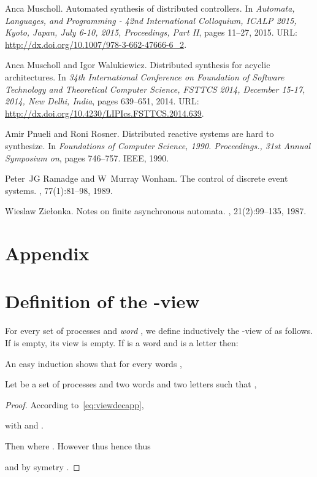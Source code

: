 \documentclass[a4paper,UKenglish]{lipics-v2016}
\begin{document}
\begin{thebibliography}{10}
Anca Muscholl.
\newblock Automated synthesis of distributed controllers.
\newblock In {\em Automata, Languages, and Programming - 42nd International
  Colloquium, {ICALP} 2015, Kyoto, Japan, July 6-10, 2015, Proceedings, Part
  {II}}, pages 11--27, 2015.
\newblock URL: \url{http://dx.doi.org/10.1007/978-3-662-47666-6_2}.

Anca Muscholl and Igor Walukiewicz.
\newblock Distributed synthesis for acyclic architectures.
\newblock In {\em 34th International Conference on Foundation of Software
  Technology and Theoretical Computer Science, {FSTTCS} 2014, December 15-17,
  2014, New Delhi, India}, pages 639--651, 2014.
\newblock URL: \url{http://dx.doi.org/10.4230/LIPIcs.FSTTCS.2014.639}.

Amir Pnueli and Roni Rosner.
\newblock Distributed reactive systems are hard to synthesize.
\newblock In {\em Foundations of Computer Science, 1990. Proceedings., 31st
  Annual Symposium on}, pages 746--757. IEEE, 1990.

Peter~JG Ramadge and W~Murray Wonham.
\newblock The control of discrete event systems.
, 77(1):81--98, 1989.

Wieslaw Zie{\l}onka.
\newblock Notes on finite asynchronous automata.
, 21(2):99--135, 1987.

\end{thebibliography}

\newpage







\section*{Appendix}

\section{Definition of the -view}

For every set of processes  and \emph{word} ,
we define inductively the -view of  as
follows.
If  is empty, its view is empty.
If  is a word and  is a letter then:


An easy induction shows that for every words ,



\begin{lemma}\label{lem:vi}
Let  be a set of processes and  two words and  two letters such that ,

\end{lemma}
\begin{proof}
According to~\eqref{eq:viewdecapp},

with 
and .

Then 
where . However  thus 
 hence  thus

and by symetry
.
\end{proof}
\end{document}
